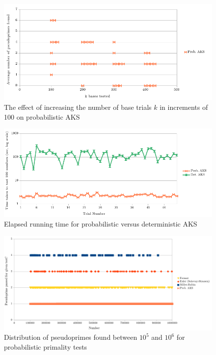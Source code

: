 \documentclass{article}
\begin{document}
\FloatBarrier
\begin{figure}[h!]
\caption{The effect of increasing the number of base trials $k$ in increments of 100 on probabilistic AKS}
\label{fig:paks_pprimes_v_bases}
\centering
\includegraphics[width=\textwidth]{paks_pprimes_v_bases}
\end{figure}
\FloatBarrier

\FloatBarrier
\begin{figure}[h!]
\caption{Elapsed running time for probabilistic versus deterministic AKS}
\label{fig:paks_v_daks}
\centering
\includegraphics[width=\textwidth]{paks_v_daks}
\end{figure}
\FloatBarrier

\FloatBarrier
\begin{figure}[h!]
\caption{Distribution of pseudoprimes found between $10^5$ and $10^6$ for probabilistic primality tests}
\label{fig:pprimes_passed}
\centering
\includegraphics[width=\textwidth]{pprimes_passed}
\end{figure}
\FloatBarrier
\end{document}
